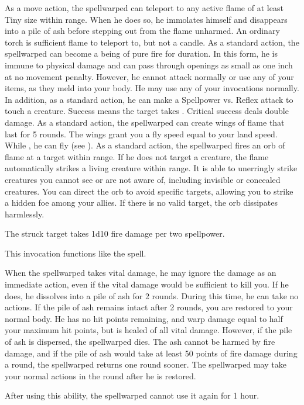             As a move action, the spellwarped can teleport to any active flame of at least Tiny size within \rngmed range.
            When he does so, he immolates himself and disappears into a pile of ash before stepping out from the flame unharmed.
            An ordinary torch is sufficient flame to teleport to, but not a candle.
            As a standard action, the spellwarped can become a being of pure fire for \durshort duration.
            In this form, he is immune to physical damage and can pass through openings as small as one inch at no movement penalty.
            However, he cannot attack normally or use any of your items, as they meld into your body.
            He may use any of your invocations normally.
            In addition, as a standard action, he can make a Spellpower vs. Reflex attack to touch a creature.
            Success means the target takes .
            Critical success deals double damage.
            As a standard action, the spellwarped can create wings of flame that last for 5 rounds.
            The wings grant you a fly speed equal to your land speed.
            While \unencumbered, he can fly (see ).
            As a standard action, the spellwarped fires an orb of flame at a target within \rnglong range.
            If he does not target a creature, the flame automatically strikes a living creature within range.
            It is able to unerringly strike creatures you cannot see or are not aware of, including invisible or concealed creatures.
            You can direct the orb to avoid specific targets, allowing you to strike a hidden foe among your allies.
            If there is no valid target, the orb dissipates harmlessly.
            \par The struck target takes 1d10 fire damage per two spellpower.

            This invocation functions like the  spell.

            When the spellwarped takes vital damage, he may ignore the damage as an immediate action, even if the vital damage would be sufficient to kill you.
            If he does, he dissolves into a pile of ash for 2 rounds.
            During this time, he can take no actions.
            If the pile of ash remains intact after 2 rounds, you are restored to your normal body.
            He has no hit points remaining, and warp damage equal to half your maximum hit points, but is healed of all vital damage.
            However, if the pile of ash is dispersed, the spellwarped dies.
            The ash cannot be harmed by fire damage, and if the pile of ash would take at least 50 points of fire damage during a round, the spellwarped returns one round sooner.
            The spellwarped may take your normal actions in the round after he is restored.
            \par After using this ability, the spellwarped cannot use it again for 1 hour.

